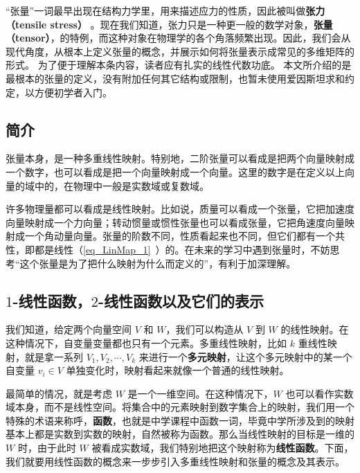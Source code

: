 


“张量”一词最早出现在结构力学里，用来描述应力的性质，因此被叫做\textbf{张力（tensile stress）}%
。现在我们知道，张力只是一种更一般的数学对象，\textbf{张量（tensor）}，的特例，而这种对象在物理学的各个角落频繁出现。因此，我们会从现代角度，从根本上定义张量的概念，并展示如何将张量表示成常见的多维矩阵的形式。 为了便于理解本条内容，读者应有扎实的线性代数功底。 本文所介绍的是最根本的张量的定义，没有附加任何其它结构或限制，也暂未使用爱因斯坦求和约定，以方便初学者入门。

\subsection{简介}

张量本身，是一种多重线性映射。特别地，二阶张量可以看成是把两个向量映射成一个数字，也可以看成是把一个向量映射成一个向量。这里的数字是在定义以上向量的域中的，在物理中一般是实数域或复数域。

许多物理量都可以看成是线性映射。比如说，质量可以看成一个张量，它把加速度向量映射成一个力向量；转动惯量或惯性张量也可以看成张量，它把角速度向量映射成一个角动量向量。张量的阶数不同，性质看起来也不同，但它们都有一个共性，即都是线性（\autoref{eq_LinMap_1}~）的。在未来的学习中遇到张量时，不妨思考“这个张量是为了把什么映射为什么而定义的”，有利于加深理解。

\subsection{$1$-线性函数，$2$-线性函数以及它们的表示}\label{sub_Tensor_1}

我们知道，给定两个向量空间 $V$ 和 $W$，我们可以构造从 $V$ 到 $W$ 的线性映射。在这种情况下，自变量变量都也只有一个元素。多重线性映射，比如 $k$ 重线性映射，就是拿一系列 $V_1, V_2, \cdots, V_k$ 来进行一个\textbf{多元映射}，让这个多元映射中的某一个自变量 ${v}_i\in V$ 单独变化时，映射看起来就像一个普通的线性映射。

最简单的情况，就是考虑 $W$ 是一个一维空间。在这种情况下，$W$ 也可以看作实数域本身，而不是线性空间。将集合中的元素映射到数字集合上的映射，我们用一个特殊的术语来称呼，\textbf{函数}，也就是中学课程中函数一词，毕竟中学所涉及到的映射基本上都是实数到实数的映射，自然被称为函数。那么当线性映射的目标是一维的 $W$ 时，由于此时 $W$ 被看成实数域，我们特别地把这个映射称为\textbf{线性函数}。下面，我们就要用线性函数的概念来一步步引入多重线性映射和张量的概念及其表示。

